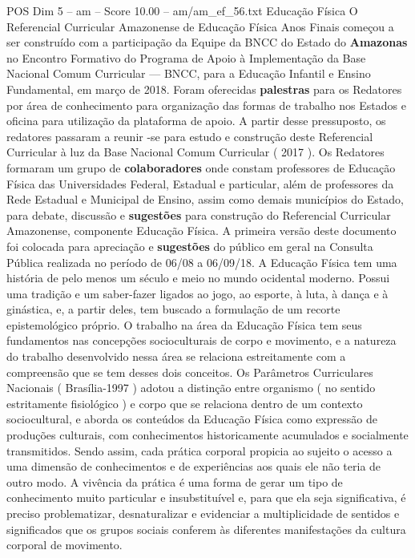 \begin{textsample}{POS Dim 5 – am – Score 10.00 – am/am\_ef\_56.txt}  \label{ex:f5_pos_064}
Educação Física O Referencial Curricular Amazonense de Educação Física Anos Finais começou a ser construído com a participação da Equipe da BNCC do Estado do \textbf{Amazonas} no Encontro Formativo do Programa de Apoio à Implementação da Base Nacional Comum Curricular — BNCC, para a Educação Infantil e Ensino Fundamental, em março de 2018.
Foram oferecidas \textbf{palestras} para os Redatores por área de conhecimento para organização das formas de trabalho nos Estados e oficina para utilização da plataforma de apoio.
A partir desse pressuposto, os redatores passaram a reunir -se para estudo e construção deste Referencial Curricular à luz da Base Nacional Comum Curricular ( 2017 ).
Os Redatores formaram um grupo de \textbf{colaboradores} onde constam professores de Educação Física das Universidades Federal, Estadual e particular, além de professores da Rede Estadual e Municipal de Ensino, assim como demais municípios do Estado, para debate, discussão e \textbf{sugestões} para construção do Referencial Curricular Amazonense, componente Educação Física.
A primeira versão deste documento foi colocada para apreciação e \textbf{sugestões} do público em geral na Consulta Pública realizada no período de 06/08 a 06/09/18.
A Educação Física tem uma história de pelo menos um século e meio no mundo ocidental moderno.
Possui uma tradição e um saber-fazer ligados ao jogo, ao esporte, à luta, à dança e à ginástica, e, a partir deles, tem buscado a formulação de um recorte epistemológico próprio.
O trabalho na área da Educação Física tem seus fundamentos nas concepções socioculturais de corpo e movimento, e a natureza do trabalho desenvolvido nessa área se relaciona estreitamente com a compreensão que se tem desses dois conceitos.
Os Parâmetros Curriculares Nacionais ( Brasília-1997 ) adotou a distinção entre organismo ( no sentido estritamente fisiológico ) e corpo que se relaciona dentro de um contexto sociocultural, e aborda os conteúdos da Educação Física como expressão de produções culturais, com conhecimentos historicamente acumulados e socialmente transmitidos.
Sendo assim, cada prática corporal propicia ao sujeito o acesso a uma dimensão de conhecimentos e de experiências aos quais ele não teria de outro modo.
A vivência da prática é uma forma de gerar um tipo de conhecimento muito particular e insubstituível e, para que ela seja significativa, é preciso problematizar, desnaturalizar e evidenciar a multiplicidade de sentidos e significados que os grupos sociais conferem às diferentes manifestações da cultura corporal de movimento.

\end{textsample}
